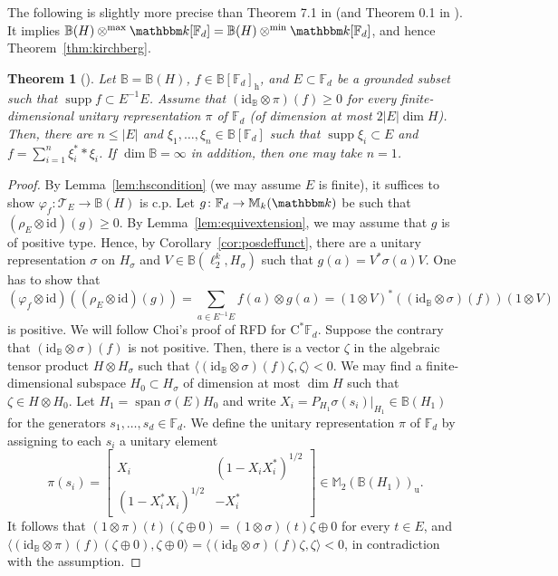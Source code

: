 \documentclass[12pt]{amsart}
\newtheorem{thm}{Theorem}
\theoremstyle{definition}
\begin{document}
The following is slightly more precise than
Theorem 7.1 in \cite{bt} (and Theorem 0.1 in \cite{mccullough}).
It implies ${{\mathbb B}}({H})\otimes^{\max}{{\mathbbm k}}[{{\mathbb F}}_d]={{\mathbb B}}({H})\otimes^{\min}{{\mathbbm k}}[{{\mathbb F}}_d]$,
and hence Theorem~\ref{thm:kirchberg}.

\begin{thm}[\cite{bt}]\label{thm:schmudgen}
Let ${{\mathbb B}}={{\mathbb B}}({H})$, $f\in {{\mathbb B}}[{{\mathbb F}}_d]_{\mathrm{h}}$, and $E\subset{{\mathbb F}}_d$ be a grounded subset
such that $\operatorname*{supp} f\subset E^{-1}E$.
Assume that $({\mathrm{id}}_{{\mathbb B}}\otimes\pi)(f)\geq0$ for
every finite-dimensional unitary representation $\pi$ of ${{\mathbb F}}_d$
(of dimension at most $2|E|\dim{H}$).
Then, there are $n\le|E|$ and $\xi_1,\ldots,\xi_n\in {{\mathbb B}}[{{\mathbb F}}_d]$ such that
$\operatorname*{supp}\xi_i\subset E$ and $f=\sum_{i=1}^n \xi_i^**\xi_i$.
If $\dim{{\mathbb B}}=\infty$ in addition, then one may take $n=1$.
\end{thm}
\begin{proof}
By Lemma~\ref{lem:hscondition} (we may assume $E$ is finite),
it suffices to show ${\varphi}_f\colon{{\mathcal T}}_E\to{{\mathbb B}}({H})$ is c.p.
Let $g\colon{{\mathbb F}}_d\to{{\mathbb M}}_k({{\mathbbm k}})$ be such that $(\rho_E\otimes{\mathrm{id}})(g)\geq0$.
By Lemma~\ref{lem:equivextension}, we may assume that $g$ is of positive type.
Hence, by Corollary~\ref{cor:posdeffunct}, there are a unitary representation
$\sigma$ on ${H}_\sigma$ and $V\in{{\mathbb B}}(\ell_2^k,{H}_\sigma)$ such that
$g(a)=V^*\sigma(a)V$.
One has to show that
\[
({\varphi}_f\otimes{\mathrm{id}})((\rho_E\otimes{\mathrm{id}})(g))=\sum_{a\in E^{-1}E} f(a)\otimes g(a)
=(1\otimes V)^*(({\mathrm{id}}_{{\mathbb B}}\otimes\sigma)(f))(1\otimes V)
\]
is positive. We will follow Choi's proof of RFD for $\mathrm{C}^*{{\mathbb F}}_d$.
Suppose the contrary that $({\mathrm{id}}_{{\mathbb B}}\otimes\sigma)(f)$ is not positive.
Then, there is a vector $\zeta$ in the algebraic tensor product ${H}\otimes{H}_\sigma$
such that ${\mathopen{\langle}{({\mathrm{id}}_{{\mathbb B}}\otimes\sigma)(f)\zeta,\zeta}\mathclose{\rangle}}<0$.
We may find a finite-dimensional subspace ${H}_0\subset{H}_\sigma$
of dimension at most $\dim{H}$ such that $\zeta\in {H}\otimes{H}_0$.
Let ${H}_1=\operatorname*{span}\sigma(E){H}_0$ and
write $X_i=P_{{H}_1}\sigma(s_i)|_{{H}_1}\in{{\mathbb B}}({H}_1)$
for the generators $s_1,\ldots,s_d\in{{\mathbb F}}_d$. We define the
unitary representation $\pi$ of ${{\mathbb F}}_d$ by assigning to each $s_i$ a unitary element
\[
\pi(s_i)=\begin{bmatrix} X_i & (1-X_iX_i^*)^{1/2}\\ (1-X_i^*X_i)^{1/2} & -X_i^*\end{bmatrix}
 \in{{\mathbb M}}_2({{\mathbb B}}({H}_1))_{\mathrm{u}}.
\]
It follows that
$(1\otimes\pi)(t)(\zeta\oplus 0)=(1\otimes\sigma)(t)\zeta\oplus 0$ for every $t\in E$,
and
${\mathopen{\langle}{({\mathrm{id}}_{{\mathbb B}}\otimes\pi)(f)(\zeta\oplus 0),\zeta\oplus 0}\mathclose{\rangle}}={\mathopen{\langle}{({\mathrm{id}}_{{\mathbb B}}\otimes\sigma)(f)\zeta,\zeta}\mathclose{\rangle}}<0$,
in contradiction with the assumption.
\end{proof}
\end{document}
